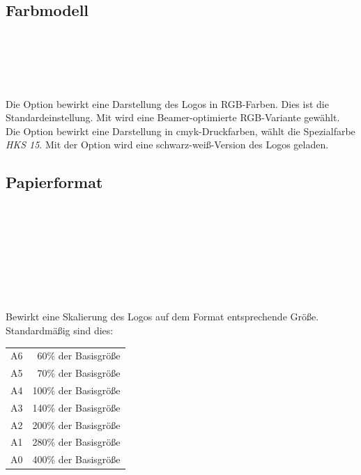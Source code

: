 \subsection{Farbmodell}\label{options:color}

\begin{Declaration}
  \\
  \\
  \\
  \\
\end{Declaration}

Die Option  bewirkt eine Darstellung des Logos in RGB-Farben.
Dies ist die Standardeinstellung.
Mit  wird eine Beamer-optimierte RGB-Variante gewählt.
Die Option  bewirkt eine Darstellung in cmyk-Druckfarben,
 wählt die Spezialfarbe \emph{HKS 15}.
Mit der Option  wird eine schwarz-weiß-Version des Logos geladen.

\subsection{Papierformat}\label{options:papersize}

\begin{Declaration}
  \\
  \\
  \\
  \\
  \\
  \\
  \\
\end{Declaration}
Bewirkt eine Skalierung des Logos auf dem Format entsprechende Größe.
Standardmäßig sind dies:

\begin{tabular}{lr}
  A6  & 60\% der Basisgröße   \\
  A5  & 70\% der Basisgröße   \\
  A4  & 100\% der Basisgröße  \\
  A3  & 140\% der Basisgröße  \\
  A2  & 200\% der Basisgröße  \\
  A1  & 280\% der Basisgröße  \\
  A0  & 400\% der Basisgröße   \\
\end{tabular}

